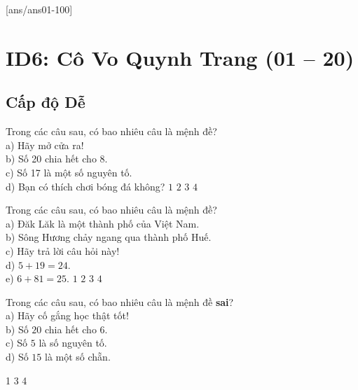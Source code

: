 
[ans/ans01-100]
\setcounter{ex}{0}
\section*{ID6: Cô Vo Quynh Trang (01 -- 20)}
\subsection*{Cấp độ Dễ}
\begin{ex}%
	Trong các câu sau, có bao nhiêu câu là mệnh đề?\\
	a) Hãy mở cửa ra!\\
	b) Số 20 chia hết cho 8.\\
	c) Số 17 là một số nguyên tố.\\
	d) Bạn có thích chơi bóng đá không?
	\choice
	{$1$}
	{\True $2$}
	{$3$}
	{$4$} 
\end{ex}

\begin{ex}%
	Trong các câu sau, có bao nhiêu câu là mệnh đề?\\
	a) Đăk Lăk là một thành phố của Việt Nam.\\
	b) Sông Hương chảy ngang qua thành phố Huế.\\
	c) Hãy trả lời câu hỏi này!\\
	d) $5+19=24$.\\
	e) $6+81=25$.
	\choice 
	{ $1$}
	{ $2$}
	{ $3$}
	{ \True $4$} 
\end{ex}

\begin{ex}%
	Trong các câu sau, có bao nhiêu câu là mệnh đề \textbf{sai}?\\
	a) Hãy cố gắng học thật tốt!\\
	b) Số $20$ chia hết cho 6.\\
	c) Số $5$ là số nguyên tố.\\
	d) Số $15$ là một số chẵn.
	
	\choice 
	{ 1} 
	{  } 
	{ 3} 
	{ 4}
\end{ex}

